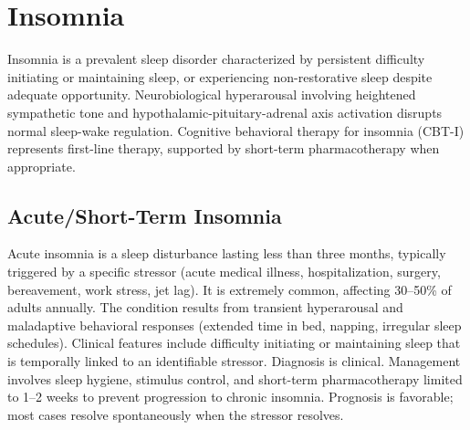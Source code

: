 \section{Insomnia}




Insomnia is a prevalent sleep disorder characterized by persistent difficulty initiating or maintaining sleep, or experiencing non-restorative sleep despite adequate opportunity. Neurobiological hyperarousal involving heightened sympathetic tone and hypothalamic-pituitary-adrenal axis activation disrupts normal sleep-wake regulation. Cognitive behavioral therapy for insomnia (CBT-I) represents first-line therapy, supported by short-term pharmacotherapy when appropriate.





\label{sec:Insomnia}

\subsection{Acute/Short-Term Insomnia}
\label{sec:Acute Short-Term Insomnia}
Acute insomnia is a sleep disturbance lasting less than three months, typically triggered by a specific stressor (acute medical illness, hospitalization, surgery, bereavement, work stress, jet lag). It is extremely common, affecting 30--50\% of adults annually. The condition results from transient hyperarousal and maladaptive behavioral responses (extended time in bed, napping, irregular sleep schedules). Clinical features include difficulty initiating or maintaining sleep that is temporally linked to an identifiable stressor. Diagnosis is clinical. Management involves sleep hygiene, stimulus control, and short-term pharmacotherapy limited to 1--2 weeks to prevent progression to chronic insomnia. Prognosis is favorable; most cases resolve spontaneously when the stressor resolves.

